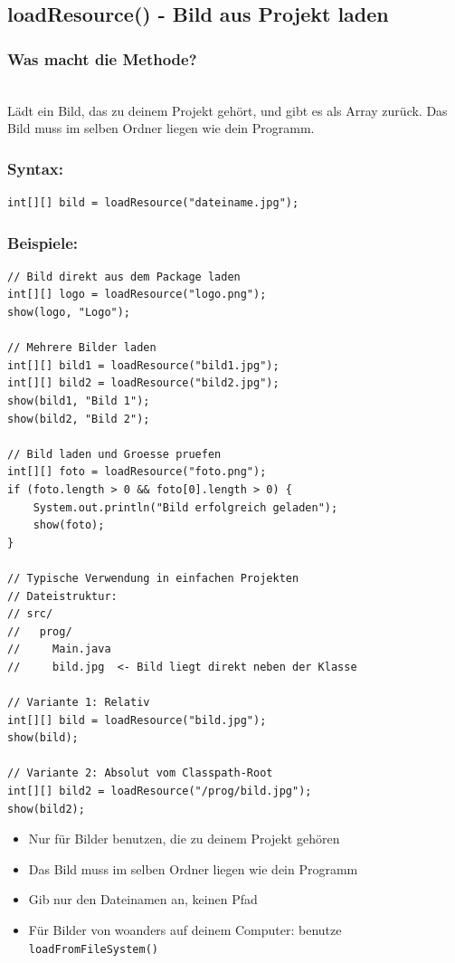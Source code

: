 \newpage


\subsection*{loadResource() - Bild aus Projekt laden}

\subsubsection*{Was macht die Methode?}\\
Lädt ein Bild, das zu deinem Projekt gehört, und gibt es als Array zurück.
Das Bild muss im selben Ordner liegen wie dein Programm.

\subsubsection*{Syntax:}
\begin{lstlisting}
int[][] bild = loadResource("dateiname.jpg");
\end{lstlisting}

\subsubsection*{Beispiele:}
\begin{lstlisting}
// Bild direkt aus dem Package laden
int[][] logo = loadResource("logo.png");
show(logo, "Logo");

// Mehrere Bilder laden
int[][] bild1 = loadResource("bild1.jpg");
int[][] bild2 = loadResource("bild2.jpg");
show(bild1, "Bild 1");
show(bild2, "Bild 2");

// Bild laden und Groesse pruefen
int[][] foto = loadResource("foto.png");
if (foto.length > 0 && foto[0].length > 0) {
    System.out.println("Bild erfolgreich geladen");
    show(foto);
}

// Typische Verwendung in einfachen Projekten
// Dateistruktur:
// src/
//   prog/
//     Main.java
//     bild.jpg  <- Bild liegt direkt neben der Klasse

// Variante 1: Relativ
int[][] bild = loadResource("bild.jpg");
show(bild);

// Variante 2: Absolut vom Classpath-Root
int[][] bild2 = loadResource("/prog/bild.jpg");
show(bild2);
\end{lstlisting}

\begin{achtung}
	\begin{itemize}
		\item Nur für Bilder benutzen, die zu deinem Projekt gehören
		\item Das Bild muss im selben Ordner liegen wie dein Programm
		\item Gib nur den Dateinamen an, keinen Pfad
		\item Für Bilder von woanders auf deinem Computer: benutze \texttt{loadFromFileSystem()}
	\end{itemize}
\end{achtung}

